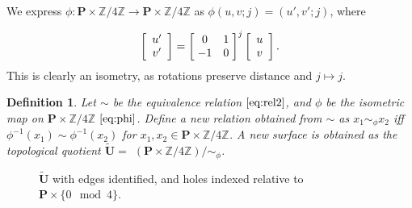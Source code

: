 \documentclass[]{article}
\newtheorem{Def}{Definition}[section]
\begin{document}
We express $\phi:\mathbf{P}\times\mathbb{Z}/4\mathbb{Z} \rightarrow \mathbf{P}\times\mathbb{Z}/4\mathbb{Z}$ as $\phi(u,v;j) = (u',v';j)$, where

\begin{equation}
	\left[\begin{array}{c}
		u'\\v'
	\end{array}\right] =
		\left[ \hspace{1mm} \begin{matrix}
				0 & 1\\
				-1 & 0
			\end{matrix}\hspace{1mm}\right]^{j}\left[\begin{array}{c}
					u\\v
				\end{array}\right].
\label{eq:phi}
\end{equation}
This is clearly an isometry, as rotations preserve distance and $j\mapsto j$.

\begin{Def} Let $\sim$ be the equivalence relation $\eqref{eq:rel2}$, and $\phi$ be the isometric map on $\mathbf{P}\times\mathbb{Z}/4\mathbb{Z}$ $\eqref{eq:phi}$. Define a new relation obtained from $\sim$ as $x_1\sim_{\phi}x_2$ iff $\phi^{-1}(x_1) \sim \phi^{-1}(x_2)$ for $x_1,x_2\in\mathbf{P}\times\mathbb{Z}/4\mathbb{Z}$. A new surface is obtained as the topological quotient $\tilde{\mathbf{U}}=$ $(\mathbf{P}\times\mathbb{Z}/4\mathbb{Z})/\sim_{\phi}$.\label{eq:simphi}
\end{Def}


\begin{figure}[H]
\centering

\caption{$\tilde{\mathbf{U}}$ with edges identified, and holes indexed relative to $\mathbf{P}\times\{0\mod{4}\}$.}
\label{fig:utilda}
\end{figure}
\end{document}
